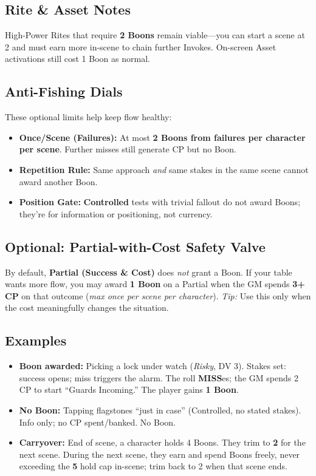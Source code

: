 \subsection*{Rite \& Asset Notes}
High-Power Rites that require \textbf{2 Boons} remain viable—you can start a scene at 2 and must earn more in-scene to chain further Invokes. On-screen Asset activations still cost 1 Boon as normal.

\subsection*{Anti-Fishing Dials}
These optional limits help keep flow healthy:
\begin{itemize}
  \item \textbf{Once/Scene (Failures):} At most \textbf{2 Boons from failures per character per scene}. Further misses still generate CP but no Boon.
  \item \textbf{Repetition Rule:} Same approach \emph{and} same stakes in the same scene cannot award another Boon.
  \item \textbf{Position Gate:} \textbf{Controlled} tests with trivial fallout do not award Boons; they're for information or positioning, not currency.
\end{itemize}

\subsection*{Optional: Partial-with-Cost Safety Valve}
By default, \textbf{Partial (Success \& Cost)} does \emph{not} grant a Boon. If your table wants more flow, you may award \textbf{1 Boon} on a Partial when the GM spends \textbf{3+ CP} on that outcome (\emph{max once per scene per character}). \emph{Tip:} Use this only when the cost meaningfully changes the situation.

\subsection*{Examples}
\begin{itemize}
  \item \textbf{Boon awarded:} Picking a lock under watch (\emph{Risky}, DV 3). Stakes set: success opens; miss triggers the alarm. The roll \textbf{MISS}es; the GM spends 2 CP to start ``Guards Incoming.'' The player gains \textbf{1 Boon}.
  \item \textbf{No Boon:} Tapping flagstones ``just in case'' (Controlled, no stated stakes). Info only; no CP spent/banked. No Boon.
  \item \textbf{Carryover:} End of scene, a character holds 4 Boons. They trim to \textbf{2} for the next scene. During the next scene, they earn and spend Boons freely, never exceeding the \textbf{5} hold cap in-scene; trim back to 2 when that scene ends.
\end{itemize}

